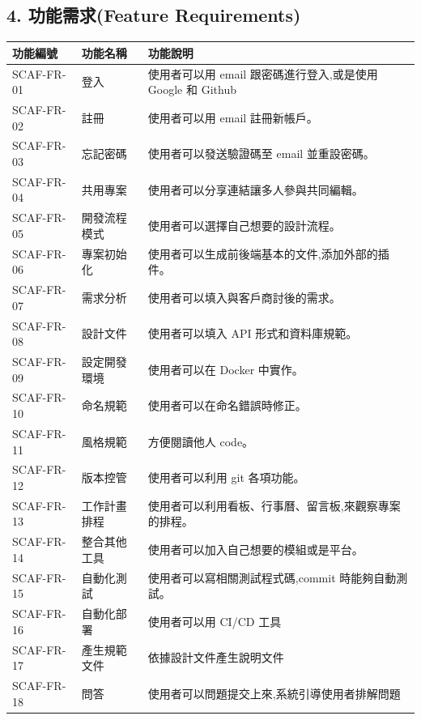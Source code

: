 \documentclass{report}
\begin{document}
\subsection*{4. 功能需求(Feature Requirements)}

\begin{tabularx}{\textwidth}{
  |p{}%
  |p{}%
  |p{}|%
}
  \hline
  功能編號 & 功能名稱 & 功能說明 \\ \hline
  SCAF-FR-01 & 登入 & 使用者可以用 email 跟密碼進行登入,或是使用 Google 和 Github \\ \hline
  SCAF-FR-02 & 註冊 & 使用者可以用 email 註冊新帳戶。 \\ \hline
  SCAF-FR-03 & 忘記密碼 & 使用者可以發送驗證碼至 email 並重設密碼。 \\ \hline
  SCAF-FR-04 & 共用專案 & 使用者可以分享連結讓多人參與共同編輯。 \\ \hline
  SCAF-FR-05 & 開發流程模式 & 使用者可以選擇自己想要的設計流程。 \\ \hline
  SCAF-FR-06 & 專案初始化 & 使用者可以生成前後端基本的文件,添加外部的插件。 \\ \hline
  SCAF-FR-07 & 需求分析 & 使用者可以填入與客戶商討後的需求。 \\ \hline
  SCAF-FR-08 & 設計文件 & 使用者可以填入 API 形式和資料庫規範。 \\ \hline
  SCAF-FR-09 & 設定開發環境 & 使用者可以在 Docker 中實作。 \\ \hline
  SCAF-FR-10 & 命名規範 & 使用者可以在命名錯誤時修正。 \\ \hline
  SCAF-FR-11 & 風格規範 & 方便閱讀他人 code。 \\ \hline
  SCAF-FR-12 & 版本控管 & 使用者可以利用 git 各項功能。 \\ \hline
  SCAF-FR-13 & 工作計畫排程 & 使用者可以利用看板、行事曆、留言板,來觀察專案的排程。 \\ \hline
  SCAF-FR-14 & 整合其他工具 & 使用者可以加入自己想要的模組或是平台。 \\ \hline
  SCAF-FR-15 & 自動化測試 & 使用者可以寫相關測試程式碼,commit 時能夠自動測試。 \\ \hline
  SCAF-FR-16 & 自動化部署 & 使用者可以用 CI/CD 工具 \\ \hline
  SCAF-FR-17 & 產生規範文件 & 依據設計文件產生說明文件 \\ \hline
  SCAF-FR-18 & 問答 & 使用者可以問題提交上來,系統引導使用者排解問題 \\ \hline
\end{tabularx}
\end{document}
